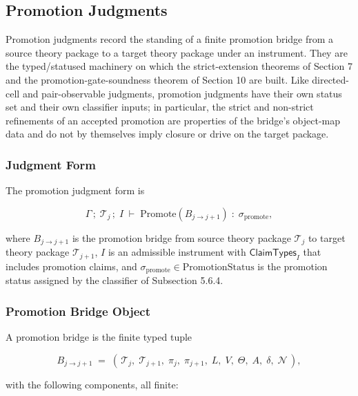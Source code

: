 \documentclass[11pt]{article}
\theoremstyle{definition}
\begin{document}
\subsection{Promotion Judgments}

Promotion judgments record the standing of a finite promotion bridge from a source theory package to a target theory package under an instrument. They are the typed/statused machinery on which the strict-extension theorems of Section 7 and the promotion-gate-soundness theorem of Section 10 are built. Like directed-cell and pair-observable judgments, promotion judgments have their own status set and their own classifier inputs; in particular, the strict and non-strict refinements of an accepted promotion are properties of the bridge's object-map data and do not by themselves imply closure or drive on the target package.

\subsubsection{Judgment Form}

The promotion judgment form is

\[
\Gamma\,;\;\mathcal T_j\,;\;I\;\vdash\;\mathrm{Promote}(B_{j\to j+1})\;:\;\sigma_{\mathrm{promote}},
\]

where \(B_{j\to j+1}\) is the promotion bridge from source theory package \(\mathcal T_j\) to target theory package \(\mathcal T_{j+1}\), \(I\) is an admissible instrument with \(\mathsf{ClaimTypes}_I\) that includes promotion claims, and \(\sigma_{\mathrm{promote}}\in\mathrm{PromotionStatus}\) is the promotion status assigned by the classifier of Subsection 5.6.4.

\subsubsection{Promotion Bridge Object}

A promotion bridge is the finite typed tuple

\[
B_{j\to j+1}\;=\;(\,\mathcal T_j,\;\mathcal T_{j+1},\;\pi_j,\;\pi_{j+1},\;L,\;V,\;\Theta,\;A,\;\delta,\;\mathcal N\,),
\]

with the following components, all finite:
\end{document}
